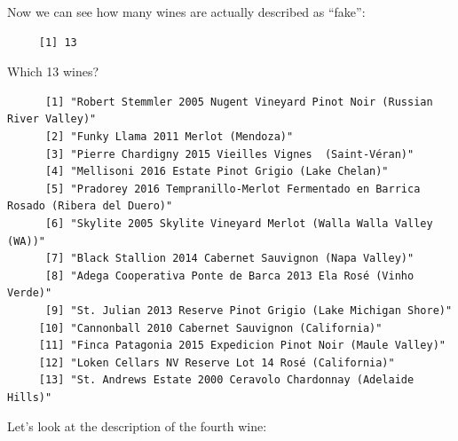 \documentclass[12pt,twoside]{amherstthesis}
\newenvironment{Shaded}{\begin{snugshade}}{\end{snugshade}}
\newcommand{\KeywordTok}[1]{\textcolor[rgb]{0.13,0.29,0.53}{\textbf{#1}}}
\newcommand{\DecValTok}[1]{\textcolor[rgb]{0.00,0.00,0.81}{#1}}
\newcommand{\StringTok}[1]{\textcolor[rgb]{0.31,0.60,0.02}{#1}}
\newcommand{\OperatorTok}[1]{\textcolor[rgb]{0.81,0.36,0.00}{\textbf{#1}}}
\newcommand{\NormalTok}[1]{#1}
\begin{document}
Now we can see how many wines are actually described as ``fake'':
\begin{Shaded}
\end{Shaded}
\begin{verbatim}
     [1] 13
\end{verbatim}
Which 13 wines?
\begin{Shaded}
\end{Shaded}
\begin{verbatim}
      [1] "Robert Stemmler 2005 Nugent Vineyard Pinot Noir (Russian River Valley)"          
      [2] "Funky Llama 2011 Merlot (Mendoza)"                                               
      [3] "Pierre Chardigny 2015 Vieilles Vignes  (Saint-Véran)"                            
      [4] "Mellisoni 2016 Estate Pinot Grigio (Lake Chelan)"                                
      [5] "Pradorey 2016 Tempranillo-Merlot Fermentado en Barrica Rosado (Ribera del Duero)"
      [6] "Skylite 2005 Skylite Vineyard Merlot (Walla Walla Valley (WA))"                  
      [7] "Black Stallion 2014 Cabernet Sauvignon (Napa Valley)"                            
      [8] "Adega Cooperativa Ponte de Barca 2013 Ela Rosé (Vinho Verde)"                    
      [9] "St. Julian 2013 Reserve Pinot Grigio (Lake Michigan Shore)"                      
     [10] "Cannonball 2010 Cabernet Sauvignon (California)"                                 
     [11] "Finca Patagonia 2015 Expedicion Pinot Noir (Maule Valley)"                       
     [12] "Loken Cellars NV Reserve Lot 14 Rosé (California)"                               
     [13] "St. Andrews Estate 2000 Ceravolo Chardonnay (Adelaide Hills)"
\end{verbatim}
Let's look at the description of the fourth wine:
\end{document}

